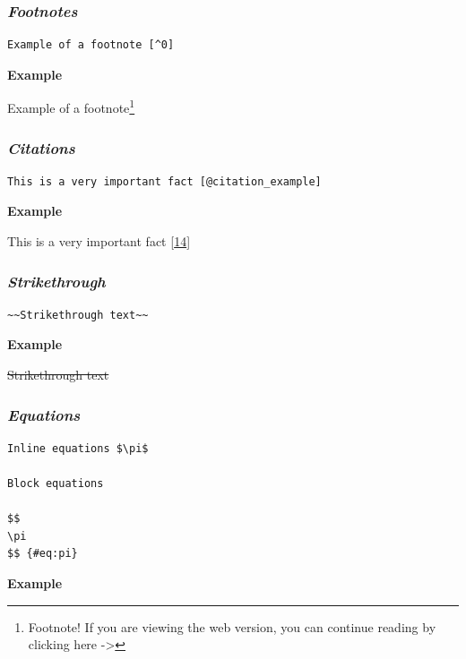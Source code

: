 \documentclass[journal,10pt,final]{IEEEtran}
\begin{document}
\subsubsection{\texorpdfstring{\textbf{\emph{Footnotes}}}{Footnotes}}\label{footnotes}

\begin{verbatim}
Example of a footnote [^0]
\end{verbatim}

\textbf{Example}

Example of a footnote\footnote{Footnote! If you are viewing the web
  version, you can continue reading by clicking here -\textgreater{}}

\subsubsection{\texorpdfstring{\textbf{\emph{Citations}}}{Citations}}\label{citations}

\begin{verbatim}
This is a very important fact [@citation_example]
\end{verbatim}

\textbf{Example}

This is a very important fact
{[}\protect\hyperlink{ref-citationux5fexample}{14}{]}

\subsubsection{\texorpdfstring{\textbf{\emph{Strikethrough}}}{Strikethrough}}\label{strikethrough}

\begin{verbatim}
~~Strikethrough text~~
\end{verbatim}

\textbf{Example}

\sout{Strikethrough text}

\subsubsection{\texorpdfstring{\textbf{\emph{Equations}}}{Equations}}\label{equations}

\begin{verbatim}
Inline equations $\pi$

Block equations

$$
\pi
$$ {#eq:pi}
\end{verbatim}

\textbf{Example}
\end{document}
